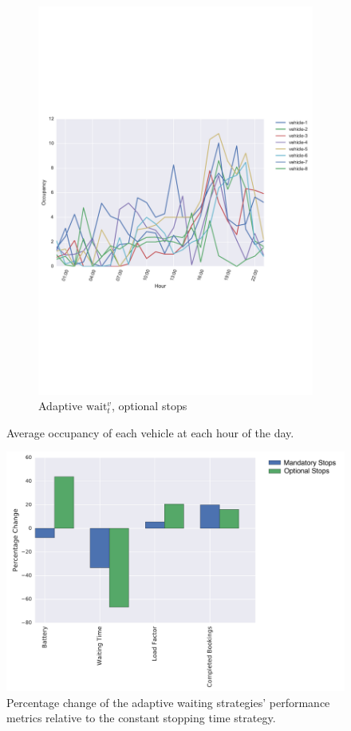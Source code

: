 \documentclass[12pt,a4paper]{article}
\begin{document}
\begin{figure}
\begin{subfigure}[b]{0.49\textwidth}
  \includegraphics[width=\linewidth]{./images/optionalstops}
  \caption{Adaptive $\text{wait}_t^{v}$, optional stops}
  \label{skipload}
\end{subfigure}
\label{simuload}
\caption{Average occupancy of each vehicle at each hour of the day.}
\end{figure}

\begin{figure}
  \centering
\includegraphics[scale=0.48]{./images/headwayCompare.pdf}
\caption{Percentage change of the adaptive waiting strategies' performance metrics relative to the constant stopping time strategy.}
\label{hwcompare}
\end{figure}
\end{document}
